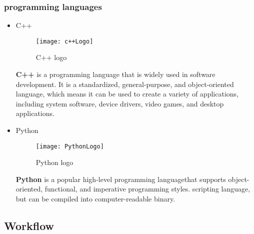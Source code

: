 \subsubsection{programming languages}
\begin{itemize}

\item C++
\FloatBarrier
\begin{figure}[h]
         \centering
        \texttt{[image: c++Logo]}
   
        \caption{C++ logo}
        \label{fig:c++Logo}
    \end{figure}
\FloatBarrier
\subitem\textbf{C++} is a programming language that is widely used in software development. It is a standardized, general-purpose, and object-oriented language, which means it can be used to create a variety of applications, including system software, device drivers, video games, and desktop applications.\cite{SD20}

\item Python
\FloatBarrier
\begin{figure}[h]
         \centering
        \texttt{[image: PythonLogo]}
   
        \caption{Python logo}
        \label{fig:PythonLogo}
    \end{figure}
\FloatBarrier
\subitem\textbf{Python} is a popular high-level programming languagethat supports object-oriented, functional, 
and imperative programming styles. scripting language, but can be compiled into computer-readable binary.\cite{SD20}


\end{itemize}

\subsection{Workflow}
